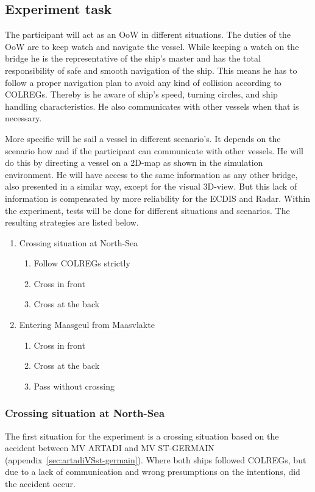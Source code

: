 \subsection{Experiment task}
\label{ssec:experiment-task}
The participant will act as an \acf{OoW} in different situations. The duties of the \ac{OoW} are to keep watch and navigate the vessel. While keeping a watch on the bridge he is the representative of the ship’s master and has the total responsibility of safe and smooth navigation of the ship. This means he has to follow a proper navigation plan to avoid any kind of collision according to COLREGs. Thereby is he aware of ship’s speed, turning circles, and ship handling characteristics. He also communicates with other vessels when that is necessary.

More specific will he sail a vessel in different scenario's. It depends on the scenario how and if the participant can communicate with other vessels. He will do this by directing a vessel on a 2D-map as shown in the simulation environment. He will have access to the same information as any other bridge, also presented in a similar way, except for the visual 3D-view. But this lack of information is compensated by more reliability for the ECDIS and Radar.
Within the experiment, tests will be done for different situations and scenarios. The resulting strategies are listed below.
\begin{multicols}{2}
\begin{enumerate}
	\item Crossing situation at North-Sea
	\begin{enumerate}[label=(\Alph*)]
		\item Follow COLREGs strictly
		\item Cross in front
		\item Cross at the back
	\end{enumerate}
	\item Entering Maasgeul from Maasvlakte
	\begin{enumerate}[label=(\Alph*)]
		\item Cross in front
		\item Cross at the back
		\item Pass without crossing
	\end{enumerate}
\end{enumerate}
\end{multicols}

\newpage

\subsubsection{Crossing situation at North-Sea}
The first situation for the experiment is a crossing situation based on the accident between MV ARTADI and MV ST-GERMAIN (appendix~\ref{sec:artadiVSst-germain}). Where both ships followed COLREGs, but due to a lack of communication and wrong presumptions on the intentions, did the accident occur.

